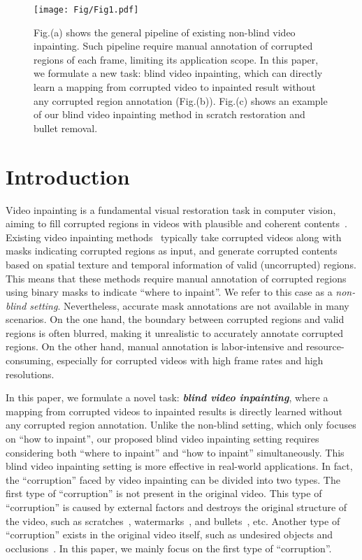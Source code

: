 \begin{figure}[tb]
  \centering
  \texttt{[image: Fig/Fig1.pdf]}
  \vspace{-0.5cm}
  \caption{ Fig.(a) shows the general pipeline of existing non-blind video inpainting. 
  Such pipeline require manual annotation of corrupted regions of each frame, limiting its application scope. 
  In this paper, we formulate a new task: blind video inpainting, which can directly learn a mapping from corrupted video to inpainted result without any corrupted region annotation (Fig.(b)).
  Fig.(c) shows an example of our blind video inpainting method in scratch restoration and bullet removal.}
  \label{Fig1}
  \vspace{-0.5cm}
\end{figure}
\section{Introduction}
\label{Introduction}
Video inpainting is a fundamental visual restoration task in computer vision, aiming to fill corrupted regions in videos with plausible and coherent contents~\cite{Wu_2023_CVPR,9967838,Wu_2023_CVPR1}. 
Existing video inpainting methods~\cite{cai2022devit,liu2021fuseformer,Ren_2022_CVPR,yan2020sttn,zhang2022flow,cherel2023infusion,yu2023deficiency,Wu_2023_CVPR,Zheng_2023_ICCV} 
typically take corrupted videos along with masks indicating corrupted regions as input, and generate corrupted contents based on spatial texture and temporal information of valid (uncorrupted) regions.
This means that these methods require manual annotation of corrupted regions using binary masks to indicate “where to inpaint”.
We refer to this case as a \emph{non-blind setting}.
Nevertheless, accurate mask annotations are not available in many scenarios.
On the one hand, the boundary between corrupted regions and valid regions is often blurred, making it unrealistic to accurately annotate corrupted regions. 
On the other hand, manual annotation is labor-intensive and resource-consuming, especially for corrupted videos with high frame rates and high resolutions.

In this paper, we formulate a novel task: \textbf{\emph{blind video inpainting}}, where a mapping from corrupted videos to inpainted results is directly learned without any corrupted region annotation.
Unlike the non-blind setting, which only focuses on “how to inpaint”, our proposed blind video inpainting setting requires considering both “where to inpaint” and “how to inpaint” simultaneously. 
This blind video inpainting setting is more effective in real-world applications.
In fact, the “corruption” faced by video inpainting can be divided into two types.
The first type of “corruption” is not present in the original video.
This type of “corruption” is caused by external factors and destroys the original structure of the video, such as scratches~\cite{chang2019free,wu2023flow}, watermarks~\cite{9967838,10222097}, and bullets~\cite{Kim_2019_CVPR}, etc.
Another type of “corruption” exists in the original video itself, such as undesired objects and occlusions~\cite{9010390,10447901}. 
In this paper, we mainly focus on the first type of “corruption”.

